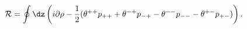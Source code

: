 \begin{equation}
 {\cal R}=\oint\dz\left(
i\partial\rho-\frac{1}{2}(
\theta^{++}p_{++}+\theta^{-+}p_{-+}-
\theta^{--}p_{--}-\theta^{+-}p_{+-})\right).\label{Rch}
\end{equation}

